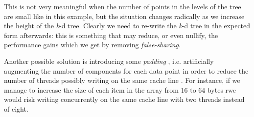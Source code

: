 \documentclass{article}
\newcommand{\kdtree}{\emph{k}-d tree}
\begin{document}
This is not very meaningful when the number of points in the levels of the tree
are small like in this example, but the situation changes radically as we
increase the height of the \kdtree{}. Clearly we need to re-write the \kdtree{}
in the expected form afterwards: this is something that may reduce, or even
nullify, the performance gains which we get by removing \emph{false-sharing}.

Another possible solution is introducing some \emph{padding}
\cite{hager2010introduction}, i.e. artificially augmenting the number of
components for each data point in order to reduce the number of threads possibly
writing on the same cache line . For instance, if we manage to increase the size
of each item in the array from 16 to 64 bytes rwe would risk writing
concurrently on the same cache line with two threads instead of eight.
\end{document}
